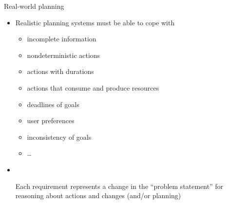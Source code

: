 \begin{frame}{Real-world planning}
  \begin{itemize}
  \item Realistic planning systems must be able to cope with
    \begin{itemize}\normalsize
    \item incomplete information
    \item nondeterministic actions
    \item actions with durations
    \item actions that consume and produce resources
    \item deadlines of goals
    \item user preferences
    \item inconsistency of goals
    \item \dots
    \end{itemize}
    \medskip
  \item {} \

    Each requirement represents a change in the ``problem statement'' for reasoning about actions and changes
    (and/or planning)
  \end{itemize}
\end{frame}
%
